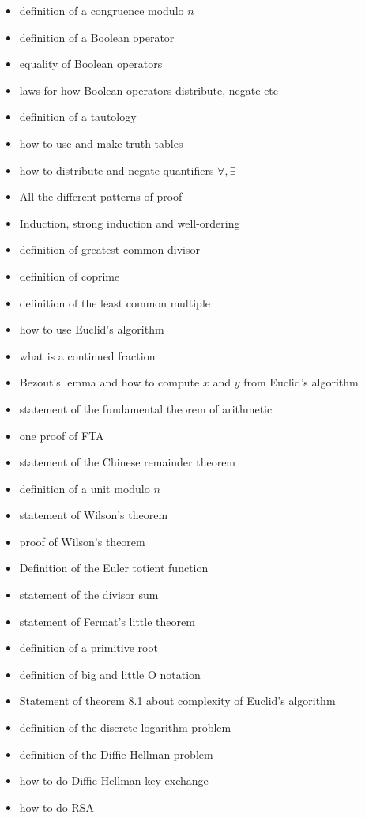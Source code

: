 \documentclass[
]{book}
\theoremstyle{definition}
\theoremstyle{definition}
\theoremstyle{definition}
\theoremstyle{definition}
\theoremstyle{remark}
\begin{document}
\begin{itemize}
\item
  definition of a congruence modulo \(n\)
\item
  definition of a Boolean operator
\item
  equality of Boolean operators
\item
  laws for how Boolean operators distribute, negate etc
\item
  definition of a tautology
\item
  how to use and make truth tables
\item
  how to distribute and negate quantifiers \(\forall, \exists\)
\item
  All the different patterns of proof
\item
  Induction, strong induction and well-ordering
\item
  definition of greatest common divisor
\item
  definition of coprime
\item
  definition of the least common multiple
\item
  how to use Euclid's algorithm
\item
  what is a continued fraction
\item
  Bezout's lemma and how to compute \(x\) and \(y\) from Euclid's algorithm
\item
  statement of the fundamental theorem of arithmetic
\item
  one proof of FTA
\item
  statement of the Chinese remainder theorem
\item
  definition of a unit modulo \(n\)
\item
  statement of Wilson's theorem
\item
  proof of Wilson's theorem
\item
  Definition of the Euler totient function
\item
  statement of the divisor sum
\item
  statement of Fermat's little theorem
\item
  definition of a primitive root
\item
  definition of big and little O notation
\item
  Statement of theorem 8.1 about complexity of Euclid's algorithm
\item
  definition of the discrete logarithm problem
\item
  definition of the Diffie-Hellman problem
\item
  how to do Diffie-Hellman key exchange
\item
  how to do RSA
\end{itemize}
\end{document}
